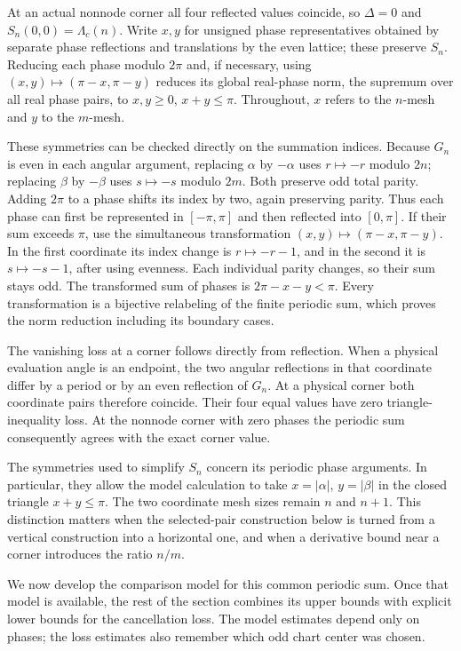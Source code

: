 At an actual nonnode corner all four reflected values coincide, so
$\Delta=0$ and $S_n(0,0)=\Lambda_c(n)$.
Write $x,y$ for unsigned phase representatives obtained by separate
phase reflections and translations by the even lattice; these preserve
$S_n$. Reducing each phase modulo $2\pi$ and, if necessary, using
$(x,y)\mapsto(\pi-x,\pi-y)$ reduces its global real-phase norm, the supremum over all real phase
pairs, to $x,y\geq0$, $x+y\leq\pi$.  Throughout, $x$ refers to the $n$-mesh and $y$ to the $m$-mesh.

These symmetries can be checked directly on the summation indices.
Because $G_n$ is even in each angular argument, replacing $\alpha$
by $-\alpha$ uses $r\mapsto-r$ modulo $2n$; replacing $\beta$
by $-\beta$ uses $s\mapsto-s$ modulo $2m$.  Both preserve odd
total parity.  Adding $2\pi$ to a phase shifts its index by two,
again preserving parity.  Thus each phase can first be represented
in $[-\pi,\pi]$ and then reflected into $[0,\pi]$.  If their
sum exceeds $\pi$, use the simultaneous transformation
$(x,y)\mapsto(\pi-x,\pi-y)$.  In the first coordinate its index
change is $r\mapsto-r-1$, and in the second it is
$s\mapsto-s-1$, after using evenness.  Each individual parity
changes, so their sum stays odd.  The transformed sum of phases
is $2\pi-x-y<\pi$.  Every transformation is a bijective
relabeling of the finite periodic sum, which proves the norm
reduction including its boundary cases.

The vanishing loss at a corner follows directly from reflection.
When a physical evaluation angle is an endpoint, the two angular reflections
in that coordinate differ by a period or by an even reflection of
$G_n$.  At a physical corner both coordinate pairs therefore coincide.
Their four equal values have zero triangle-inequality loss.  At the
nonnode corner with zero phases the periodic sum consequently agrees
with the exact corner value.

The symmetries used to simplify $S_n$ concern its periodic phase
arguments.  In particular, they allow the model calculation to take
$x=|\alpha|$, $y=|\beta|$ in the closed triangle $x+y\leq\pi$.
The two coordinate mesh sizes remain $n$ and $n+1$.  This distinction
matters when the selected-pair construction below is turned from a
vertical construction into a horizontal one, and when a derivative
bound near a corner introduces the ratio $n/m$.

We now develop the comparison model for this common periodic sum.
Once that model is available, the rest of the section combines its
upper bounds with explicit lower bounds for the cancellation loss.
The model estimates depend only on phases; the loss estimates also
remember which odd chart center was chosen.


